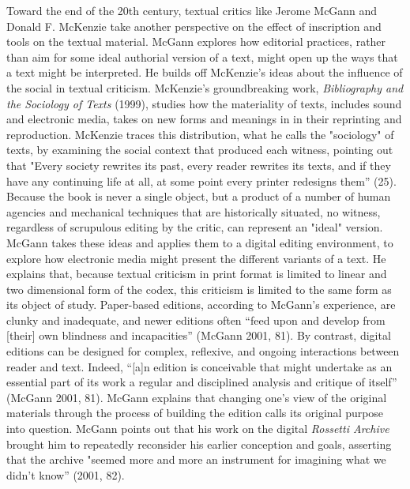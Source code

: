 \documentclass[11pt]{article}
\begin{document}
Toward the end of the 20th century, textual critics like Jerome McGann
and Donald F. McKenzie take another perspective on the effect of
inscription and tools on the textual material. McGann explores how
editorial practices, rather than aim for some ideal authorial version
of a text, might open up the ways that a text might be interpreted. He
builds off McKenzie's ideas about the influence of the social in
textual criticism. McKenzie's groundbreaking work, \emph{Bibliography and
the Sociology of Texts} (1999), studies how the materiality of texts,
includes sound and electronic media, takes on new forms and meanings
in in their reprinting and reproduction. McKenzie traces this
distribution, what he calls the "sociology" of texts, by examining the
social context that produced each witness, pointing out that "Every
society rewrites its past, every reader rewrites its texts, and if
they have any continuing life at all, at some point every printer
redesigns them” (25). Because the book is never a single object, but a
product of a number of human agencies and mechanical techniques that
are historically situated, no witness, regardless of scrupulous
editing by the critic, can represent an "ideal" version. McGann takes
these ideas and applies them to a digital editing environment, to
explore how electronic media might present the different variants of a
text. He explains that, because textual criticism in print format is
limited to linear and two dimensional form of the codex, this
criticism is limited to the same form as its object of
study. Paper-based editions, according to McGann’s experience, are
clunky and inadequate, and newer editions often “feed upon and develop
from [their] own blindness and incapacities” (McGann 2001, 81). By
contrast, digital editions can be designed for complex, reflexive, and
ongoing interactions between reader and text. Indeed, “[a]n edition is
conceivable that might undertake as an essential part of its work a
regular and disciplined analysis and critique of itself” (McGann 2001,
81). McGann explains that changing one’s view of the original
materials through the process of building the edition calls its
original purpose into question. McGann points out that his work on the
digital \emph{Rossetti Archive} brought him to repeatedly reconsider his
earlier conception and goals, asserting that the archive "seemed more
and more an instrument for imagining what we didn’t know” (2001,
82). 
\end{document}

